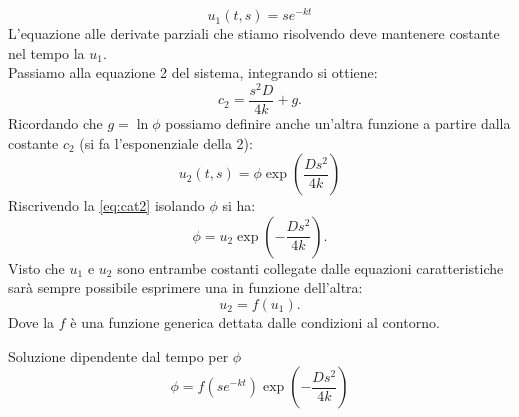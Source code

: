 \begin{equation}
    u_1(t,s) = s e^{-kt} \label{eq:cat1}
\end{equation}
L'equazione alle derivate parziali che stiamo risolvendo deve mantenere costante nel tempo la $u_1$.\\
Passiamo alla equazione 2 del sistema, integrando si ottiene:
\[
    c_2 = \frac{s^2D}{4k} + g 
.\] 
Ricordando che $g=\ln\phi$ possiamo definire anche un'altra funzione a partire dalla costante $c_2$ (si fa l'esponenziale della 2):
\begin{equation}
    u_2(t,s) = \phi \exp\left(\frac{Ds^2}{4k}\right) \label{eq:cat2}
\end{equation}
Riscrivendo la \ref{eq:cat2} isolando $\phi$ si ha:
\[
    \phi  = u_2 \exp\left(-\frac{Ds^2}{4k}\right)
.\]
Visto che $u_1$ e $u_2$ sono entrambe costanti collegate dalle equazioni caratteristiche sarà sempre possibile esprimere una in funzione dell'altra:
\[
    u_2 = f(u_1) 
.\] 
Dove la $f$ è una funzione generica dettata dalle condizioni al contorno.
\begin{redbox}{Soluzione dipendente dal tempo per $\phi$}
    \begin{equation}
    \phi =f\left(se^{-kt}\right)\exp\left(-\frac{Ds^2}{4k}\right) 
    \label{eq:car_phi}
    \end{equation}
\end{redbox}
\noindent
